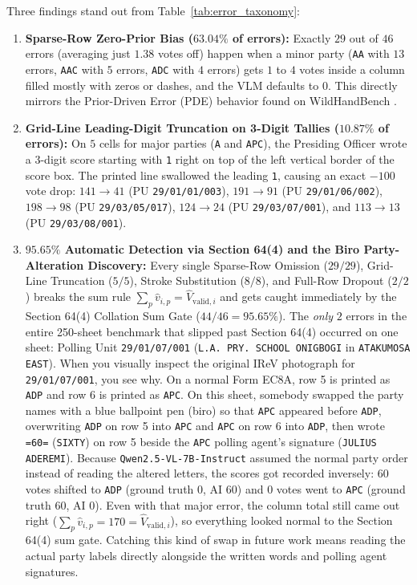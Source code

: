 \documentclass{article}
\begin{document}
Three findings stand out from Table~\ref{tab:error_taxonomy}:
\begin{enumerate}
    \item \textbf{Sparse-Row Zero-Prior Bias ($63.04\%$ of errors):} Exactly $29$ out of $46$ errors (averaging just $1.38$ votes off) happen when a minor party (\texttt{AA} with $13$ errors, \texttt{AAC} with $5$ errors, \texttt{ADC} with $4$ errors) gets $1$ to $4$ votes inside a column filled mostly with zeros or dashes, and the VLM defaults to $0$. This directly mirrors the Prior-Driven Error (PDE) behavior found on WildHandBench \cite{zhang2026wildhandbench}.
    \item \textbf{Grid-Line Leading-Digit Truncation on 3-Digit Tallies ($10.87\%$ of errors):} On $5$ cells for major parties (\texttt{A} and \texttt{APC}), the Presiding Officer wrote a 3-digit score starting with \texttt{1} right on top of the left vertical border of the score box. The printed line swallowed the leading \texttt{1}, causing an exact $-100$ vote drop: $141 \to 41$ (PU \texttt{29/01/01/003}), $191 \to 91$ (PU \texttt{29/01/06/002}), $198 \to 98$ (PU \texttt{29/03/05/017}), $124 \to 24$ (PU \texttt{29/03/07/001}), and $113 \to 13$ (PU \texttt{29/03/08/001}).
    \item \textbf{$95.65\%$ Automatic Detection via Section 64(4) and the Biro Party-Alteration Discovery:} Every single Sparse-Row Omission ($29/29$), Grid-Line Truncation ($5/5$), Stroke Substitution ($8/8$), and Full-Row Dropout ($2/2$) breaks the sum rule $\sum_p \hat{v}_{i,p} = \hat{V}_{\text{valid}, i}$ and gets caught immediately by the Section 64(4) Collation Sum Gate ($44/46 = 95.65\%$). The \emph{only} $2$ errors in the entire 250-sheet benchmark that slipped past Section 64(4) occurred on one sheet: Polling Unit \texttt{29/01/07/001} (\texttt{L.A. PRY. SCHOOL ONIGBOGI} in \texttt{ATAKUMOSA EAST}). When you visually inspect the original IReV photograph for \texttt{29/01/07/001}, you see why. On a normal Form EC8A, row 5 is printed as \texttt{ADP} and row 6 is printed as \texttt{APC}. On this sheet, somebody swapped the party names with a blue ballpoint pen (biro) so that \texttt{APC} appeared before \texttt{ADP}, overwriting \texttt{ADP} on row 5 into \texttt{APC} and \texttt{APC} on row 6 into \texttt{ADP}, then wrote \texttt{=60=} (\texttt{SIXTY}) on row 5 beside the \texttt{APC} polling agent's signature (\texttt{JULIUS ADEREMI}). Because \texttt{Qwen2.5-VL-7B-Instruct} assumed the normal party order instead of reading the altered letters, the scores got recorded inversely: $60$ votes shifted to \texttt{ADP} (ground truth $0$, AI $60$) and $0$ votes went to \texttt{APC} (ground truth $60$, AI $0$). Even with that major error, the column total still came out right ($\sum_p \hat{v}_{i,p} = 170 = \hat{V}_{\text{valid}, i}$), so everything looked normal to the Section 64(4) sum gate. Catching this kind of swap in future work means reading the actual party labels directly alongside the written words and polling agent signatures.
\end{enumerate}
\end{document}
